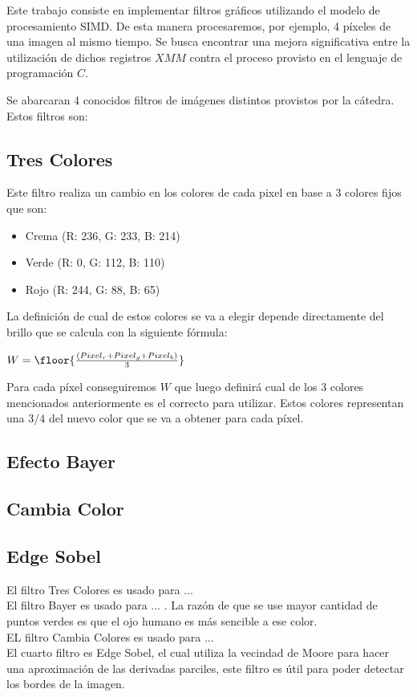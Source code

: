Este trabajo consiste en implementar filtros gráficos utilizando el modelo de procesamiento SIMD. De esta manera procesaremos, por ejemplo, 4 píxeles de una imagen al mismo tiempo. Se busca encontrar una mejora significativa entre la utilización de dichos registros $XMM$ contra el proceso provisto en el lenguaje de programación $C$. 

Se abarcaran 4 conocidos filtros de imágenes distintos provistos por la cátedra. Estos filtros son:

\subsection{Tres Colores}

Este filtro realiza un cambio en los colores de cada pixel en base a 3 colores fijos que son: 

\begin{itemize}
  \item Crema (R: 236, G: 233, B: 214)
  \item Verde (R: 0, G: 112, B: 110)
  \item Rojo (R: 244, G: 88, B: 65)
\end{itemize}

La definición de cual de estos colores se va a elegir depende directamente del brillo que se calcula con la siguiente fórmula:

$W = \floor{\frac{(Pixel_r + Pixel_g + Pixel_b)}{3}}$

Para cada píxel conseguiremos $W$ que luego definirá cual de los 3 colores mencionados anteriormente es el correcto para utilizar.
Estos colores representan una $3/4$ del nuevo color que se va a obtener para cada píxel.

\subsection{Efecto Bayer}
\subsection{Cambia Color}
\subsection{Edge Sobel}

El filtro Tres Colores es usado para ...\\
El filtro Bayer es usado para ... . La razón de que se use mayor cantidad de puntos verdes es que el ojo humano es más sencible a ese color.\\
EL filtro Cambia Colores es usado para ...\\
El cuarto filtro es Edge Sobel, el cual utiliza la vecindad de Moore para hacer una aproximaci\'on de las derivadas parciles, este filtro es \'util para poder detectar los bordes de la imagen.\\

